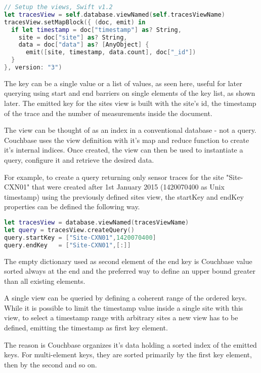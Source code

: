 \begin{lstlisting}[basicstyle=\footnotesize,caption=The map function avoiding nesting with Swift 1.2,language=Swift]
// Setup the views, Swift v1.2
let tracesView = self.database.viewNamed(self.tracesViewName)
tracesView.setMapBlock({ (doc, emit) in
  if let timestamp = doc["timestamp"] as? String, 
    site = doc["site"] as? String, 
    data = doc["data"] as? [AnyObject] {
      emit([site, timestamp, data.count], doc["_id"])
  }
}, version: "3")
\end{lstlisting}

The key can be a single value or a list of values, as seen here, useful for later querying using start and end barriers on single elements of the key list, as shown later. The emitted key for the sites view is built with the site's id, the timestamp of the trace and the number of measurements inside the document. 

The view can be thought of as an index in a conventional database - not a query. Couchbase uses the view definition with it's map and reduce function to create it's internal indices. Once created, the view can then be used to instantiate a query, configure it and retrieve the desired data.

For example, to create a query returning only sensor traces for the site "Site-CXN01" that were created after 1st January 2015 (1420070400 as Unix timestamp) using the previously defined sites view, the startKey and endKey properties can be defined the following way.

\begin{lstlisting}[basicstyle=\footnotesize,caption=Setting up the NoSQL query,language=Swift,label=lst:nosql-query]
let tracesView = database.viewNamed(tracesViewName)
let query = tracesView.createQuery()
query.startKey = ["Site-CXN01",1420070400]
query.endKey   = ["Site-CXN01",[:]]
\end{lstlisting}       

The empty dictionary used as second element of the end key is Couchbase value sorted always at the end and the preferred way to define an upper bound greater than all existing elements.

A single view can be queried by defining a coherent range of the ordered keys. While it is possible to limit the timestamp value inside a single site with this view, to select a timestamp range with arbitrary sites a new view has to be defined, emitting the timestamp as first key element.

The reason is Couchbase organizes it's data holding a sorted index of the emitted keys. For multi-element keys, they are sorted primarily by the first key element, then by the second and so on.

